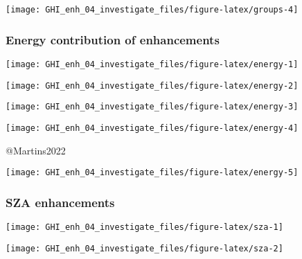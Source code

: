\documentclass[
  10pt,
  a4paper,oneside]{article}
\begin{document}
\begin{center}\texttt{[image: GHI\_enh\_04\_investigate\_files/figure-latex/groups-4]} \end{center}

\newpage
\FloatBarrier

\hypertarget{energy-contribution-of-enhancements}{%
\subsubsection{Energy contribution of enhancements}\label{energy-contribution-of-enhancements}}

\begin{center}\texttt{[image: GHI\_enh\_04\_investigate\_files/figure-latex/energy-1]} \end{center}

\begin{center}\texttt{[image: GHI\_enh\_04\_investigate\_files/figure-latex/energy-2]} \end{center}

\begin{center}\texttt{[image: GHI\_enh\_04\_investigate\_files/figure-latex/energy-3]} \end{center}

\begin{center}\texttt{[image: GHI\_enh\_04\_investigate\_files/figure-latex/energy-4]} \end{center}

@Martins2022

\begin{center}\texttt{[image: GHI\_enh\_04\_investigate\_files/figure-latex/energy-5]} \end{center}

\newpage
\FloatBarrier

\hypertarget{sza-enhancements}{%
\subsubsection{SZA enhancements}\label{sza-enhancements}}

\begin{center}\texttt{[image: GHI\_enh\_04\_investigate\_files/figure-latex/sza-1]} \end{center}

\begin{center}\texttt{[image: GHI\_enh\_04\_investigate\_files/figure-latex/sza-2]} \end{center}
\end{document}
